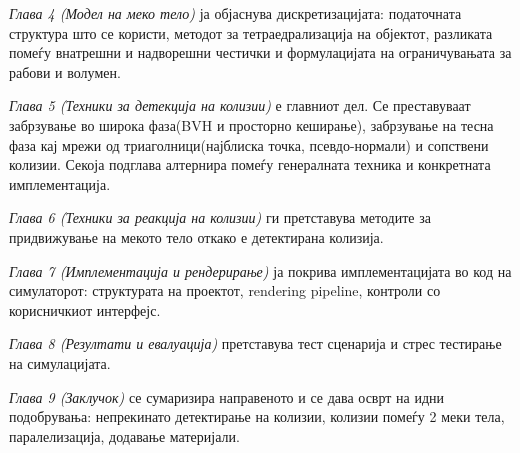 \textit{Глава 4 (Модел на меко тело)} ја објаснува дискретизацијата: податочната структура што се користи, методот за тетраедрализација на објектот, разликата помеѓу внатрешни и надворешни честички и формулацијата на ограничувањата за рабови и волумен. 

\textit{Глава 5 (Техники за детекција на колизии)} е главниот дел. Се преставуваат забрзување во широка фаза(BVH и просторно кеширање), забрзување на тесна фаза кај мрежи од триаголници(најблиска точка, псевдо-нормали) и сопствени колизии. Секоја подглава алтернира помеѓу генералната техника и конкретната имплементација.

\textit{Глава 6 (Техники за реакција на колизии)} ги претставува методите за придвижување на мекото тело откако е детектирана  колизија.

\textit{Глава 7 (Имплементација и рендерирање)} ја покрива имплементацијата во код на симулаторот: структурата на проектот, rendering pipeline, контроли со корисничкиот интерфејс.

\textit{Глава 8 (Резултати и евалуација)} претставува тест сценарија и стрес тестирање на симулацијата. 

\textit{Глава 9 (Заклучок)} се сумаризира направеното и се дава осврт на идни подобрувања: непрекинато детектирање на колизии, колизии помеѓу 2 меки тела, паралелизација, додавање материјали.



